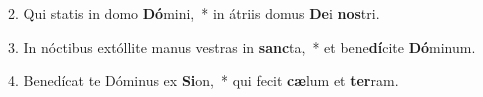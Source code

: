 2. Qui statis in domo \textbf{Dó}mini,~*  in átriis domus \textbf{De}i \textbf{nos}tri.\

3. In nóctibus extóllite manus vestras in \textbf{sanc}ta,~*  et bene\textbf{dí}cite \textbf{Dó}minum.\

4. Benedícat te Dóminus ex \textbf{Si}on,~*  qui fecit \textbf{cæ}lum et \textbf{ter}ram.\

